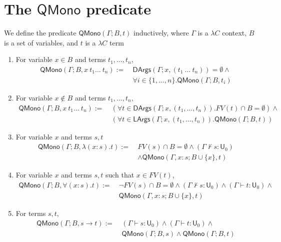 \section{The $\mathsf{QMono}$ predicate}\label{appqmono}

  \begin{definition} We define the predicate $\mathsf{QMono}(\Gamma; B, t)$ inductively,
    where $\Gamma$ is a $\lambda C$ context, $B$ is a set of variables, and $t$ is a $\lambda C$ term
    \begin{enumerate}
      \item For variable $x \in B$ and terms $t_1, \dots, t_n$,
        \begin{align*}
          \mathsf{QMono}(\Gamma; B, x \ t_1 \dots \ t_n) := \ &
          \mathsf{DArgs}(\Gamma; x, (t_1 \ \dots \ t_n)) = \emptyset \land \\
          & \forall i \in \{1, \dots, n\}. \mathsf{QMono}(\Gamma; B, t_i)
        \end{align*}
      \item For variable $x \notin B$ and terms $t_1, \dots, t_n$,
        \begin{align*}
          \mathsf{QMono}(\Gamma; B, x \ t_1 \dots \ t_n) := \ & (\forall t \in \mathsf{DArgs}(\Gamma; x, (t_1, \dots, t_n)). FV(t) \cap B = \emptyset) \land \\
          & (\forall t \in \mathsf{LArgs}(\Gamma; x, (t_1, \dots, t_n)). \mathsf{QMono}(\Gamma; B, t))
        \end{align*}
      \item For variable $x$ and terms $s, t$
        \begin{align*}
          \mathsf{QMono}(\Gamma; B, \lambda (x : s). t) := \
          & FV(s) \cap B = \emptyset \land (\Gamma \not\vdash s : \mathsf{U}_0) \\
          & \land \mathsf{QMono}(\Gamma, x : s; B \cup \{x\}, t)
        \end{align*}
      \item For variable $x$ and terms $s, t$ such that $x \in FV(t)$,
        \begin{align*}
          \mathsf{QMono}(\Gamma; B, \forall (x : s). t) := \
          & \neg FV(s) \cap B = \emptyset \land (\Gamma \not \vdash s : \mathsf{U}_0) \land  (\Gamma \vdash t : \mathsf{U}_0) \land \\
          & \mathsf{QMono}(\Gamma, x : s; B \cup \{x\}, t)
        \end{align*}
      \item For terms $s, t$,
        \begin{align*}
          \mathsf{QMono}(\Gamma; B, s \to t) := \ & (\Gamma \vdash s : \mathsf{U}_0) \land (\Gamma \vdash t : \mathsf{U}_0) \land \\
          & \mathsf{QMono}(\Gamma; B, s) \land \mathsf{QMono}(\Gamma; B, t)
        \end{align*}
    \end{enumerate}
  \end{definition}

